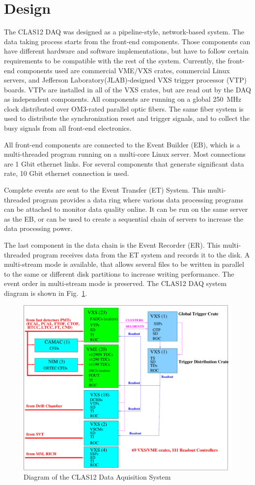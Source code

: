 \section{Design}

The CLAS12 DAQ was designed as a pipeline-style, network-based system. The data taking process starts from the front-end components. Those components can have different hardware and software implementations, but have to follow certain requirements to be compatible with the rest of the system. Currently, the front-end components used are commercial VME/VXS crates, commercial Linux servers, and Jefferson Laboratory(JLAB)-designed VXS trigger processor (VTP) boards. VTPs are installed in all of the VXS crates, but are read out by the DAQ as independent components. All components are running on a global 250~MHz clock distributed over OM3-rated parallel optic fibers. The same fiber system is used to distribute the synchronization reset and trigger signals, and to collect the busy signals from all front-end electronics.

All front-end components are connected to the Event Builder (EB), which is a multi-threaded program running on a multi-core Linux server. Most connections are 1 Gbit ethernet links. For several components that generate significant data rate, 10 Gbit ethernet connection is used.

Complete events are sent to the Event Transfer (ET) System. This multi-threaded program provides a data ring where various data processing programs can be attached to monitor data quality online. It can be run on the same server as the EB, or can be used to create a sequential chain of servers to increase the data processing power.

The last component in the data chain is the Event Recorder (ER). This multi-threaded program receives data from the ET system and records it to the disk. A multi-stream mode is available, that allows several files to be written in parallel to the same or different disk partitions to increase writing performance. The event order in multi-stream mode is preserved. The CLAS12 DAQ system diagram is shown in Fig.~\ref{fig:DAQdiagram}.

\begin{figure}[hbt]
	\centering
	\includegraphics[width=1.0\columnwidth,keepaspectratio]{img/CLAS12_HARDWARE_2.pdf}
	\caption{Diagram of the CLAS12 Data Aquisition System}
	\label{fig:DAQdiagram}
\end{figure}

